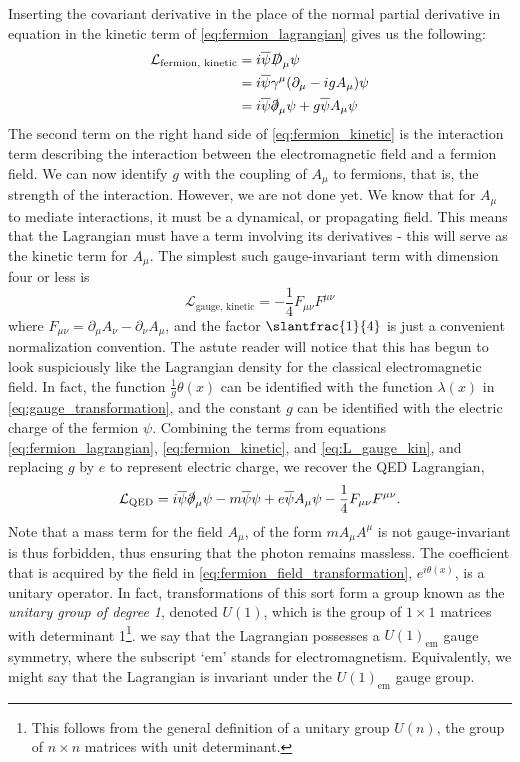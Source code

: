 Inserting the covariant derivative in the place of the normal partial derivative in equation in the kinetic term of \autoref{eq:fermion_lagrangian} gives us the following:
\begin{equation}\label{eq:fermion_kinetic}
    \begin{split}
  \mathcal{L}_\text{fermion, kinetic} &= i\overline{\psi}\slashed{D}_\mu\psi\\
&= i\overline{\psi}\gamma^\mu(\partial_\mu-igA_\mu)\psi\\
&= i\overline{\psi}\slashed{\partial}_\mu\psi + g\overline{\psi}A_\mu\psi
\end{split}
\end{equation}
The second term on the right hand side of \autoref{eq:fermion_kinetic} is the interaction term describing the interaction between the electromagnetic field and a fermion field. We can now identify $g$ with the coupling of $A_\mu$ to fermions, that is, the strength of the interaction.  However, we are not done yet. We know that for $A_\mu$ to mediate interactions, it must be a dynamical, or propagating field. This means that the Lagrangian must have a term involving its derivatives - this will serve as the kinetic term for $A_\mu$. The simplest such gauge-invariant term with dimension four or less is %
%
\begin{equation}\label{eq:L_gauge_kin}
\mathcal{L}_\text{gauge, kinetic} = -\frac{1}{4}F_{\mu\nu}F^{\mu\nu}
\end{equation}
%
where $F_{\mu\nu} = \partial_\mu A_\nu - \partial_\nu A_\mu$, and the factor $\slantfrac{1}{4}$ is just a convenient normalization convention. The astute reader will notice that this has begun to look suspiciously like the Lagrangian density for the classical electromagnetic field. In fact, the function $\frac{1}{g} \theta(x)$ can be identified with the function $\lambda(x)$ in \autoref{eq:gauge_transformation}, and the constant $g$ can be identified with the electric charge of the fermion $\psi$. Combining the terms from equations \ref{eq:fermion_lagrangian}, \ref{eq:fermion_kinetic}, and \ref{eq:L_gauge_kin}, and replacing $g$ by $e$ to represent electric charge, we recover the QED Lagrangian,
\begin{equation}
  \mathcal{L}_\text{QED} = i\overline{\psi}\slashed{\partial}_\mu\psi - m\overline{\psi}\psi + e\overline{\psi}A_\mu\psi -\frac{1}{4}F_{\mu\nu}F^{\mu\nu}.
\end{equation}
Note that a mass term for the field $A_\mu$, of the form $mA_\mu A^\mu$ is not gauge-invariant is thus forbidden, thus ensuring that the photon remains massless.
The coefficient that is acquired by the field in \autoref{eq:fermion_field_transformation}, $e^{i\theta(x)}$, is a unitary operator. In fact, transformations of this sort form a group known as the \emph{unitary group of degree 1}, denoted $U(1)$, which is the group of $1\times 1$ matrices with determinant 1\footnote{This follows from the general definition of a unitary group $U(n)$, the group of $n\times n$ matrices with unit determinant.}. we say that the Lagrangian possesses a $U(1)_\text{em}$ gauge symmetry, where the subscript `em' stands for electromagnetism. Equivalently, we might say that the Lagrangian is invariant under the $U(1)_\text{em}$ gauge group. 

